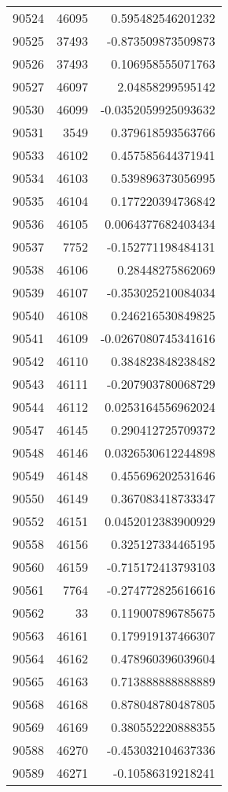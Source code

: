 \begin{tabular}{r | r | r}
90524 & 46095 & 0.595482546201232 \\
90525 & 37493 & -0.873509873509873 \\
90526 & 37493 & 0.106958555071763 \\
90527 & 46097 & 2.04858299595142 \\
90530 & 46099 & -0.0352059925093632 \\
90531 & 3549 & 0.379618593563766 \\
90533 & 46102 & 0.457585644371941 \\
90534 & 46103 & 0.539896373056995 \\
90535 & 46104 & 0.177220394736842 \\
90536 & 46105 & 0.0064377682403434 \\
90537 & 7752 & -0.152771198484131 \\
90538 & 46106 & 0.28448275862069 \\
90539 & 46107 & -0.353025210084034 \\
90540 & 46108 & 0.246216530849825 \\
90541 & 46109 & -0.0267080745341616 \\
90542 & 46110 & 0.384823848238482 \\
90543 & 46111 & -0.207903780068729 \\
90544 & 46112 & 0.0253164556962024 \\
90547 & 46145 & 0.290412725709372 \\
90548 & 46146 & 0.0326530612244898 \\
90549 & 46148 & 0.455696202531646 \\
90550 & 46149 & 0.367083418733347 \\
90552 & 46151 & 0.0452012383900929 \\
90558 & 46156 & 0.325127334465195 \\
90560 & 46159 & -0.715172413793103 \\
90561 & 7764 & -0.274772825616616 \\
90562 & 33 & 0.119007896785675 \\
90563 & 46161 & 0.179919137466307 \\
90564 & 46162 & 0.478960396039604 \\
90565 & 46163 & 0.713888888888889 \\
90568 & 46168 & 0.878048780487805 \\
90569 & 46169 & 0.380552220888355 \\
90588 & 46270 & -0.453032104637336 \\
90589 & 46271 & -0.10586319218241 \\

\end{tabular}

